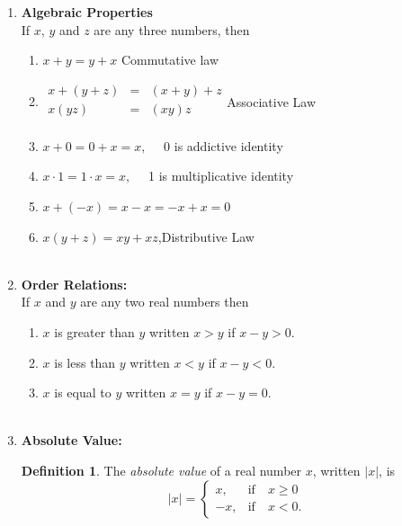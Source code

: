 \documentclass[11pt,a4paper]{article}
\theoremstyle{definition}
\newtheorem{definition}[thm]{Definition}
\begin{document}
\begin{enumerate}
\item \textbf{Algebraic Properties}\\
If $x$, $y$ and $z$ are any three numbers, then
\begin{enumerate}
\item $x+y=y+x$ \quad  Commutative law

\item $
\begin{matrix}
x+(y+z) & = & (x+y)+z\\
x(yz) & = & (xy)z\\
\end{matrix}
$\quad  Associative Law\\

\item $x+0=0+x=x,\quad $ 0 is addictive identity

\item $x\cdot 1=1\cdot x=x,\quad $ 1 is multiplicative identity

\item $x+(-x)=x-x=-x+x=0$

\item $x(y+z)=xy+xz$,\quad  Distributive Law\\\\
\end{enumerate}

\item \textbf{Order Relations:}\\
If $x$ and $y$ are any two real numbers then
\begin{enumerate}
\item $x$ is greater than $y$ written $x>y$ if $x-y>0.$

\item $x$ is less than $y$ written $x<y$ if $x-y<0$.

\item $x$ is equal to $y$ written $x=y$ if $x-y=0$.\\\\
\end{enumerate}


\item \textbf{Absolute Value:}\\
\begin{definition}
The \emph{absolute value} of a real number $x$, written $\left|x\right|$, is
$$\left|x\right|=
\begin{cases}
x, & \text{if}\quad  x\geq 0\\
-x, & \text{if} \quad  x<0 .
\end{cases}$$
\end{definition}


\end{enumerate}
\end{document}

